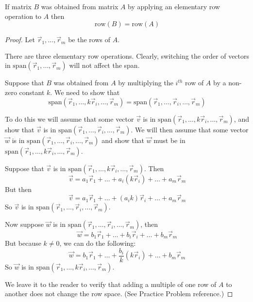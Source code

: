 \documentclass{ximera}
\begin{document}
\begin{theorem}\label{th:rowBrowA} If matrix $B$ was obtained from matrix $A$ by applying an elementary row operation to $A$ then
$$\mbox{row}(B)=\mbox{row}(A)$$
\end{theorem}
\begin{proof}
Let $\vec{r}_1,\ldots ,\vec{r}_m$ be the rows of $A$. 

There are three elementary row operations.  Clearly, switching the order of vectors in $\mbox{span}(\vec{r}_1,\ldots  ,\vec{r}_m)$ will not affect the span.  

Suppose that $B$ was obtained from $A$ by multiplying the $i^{th}$ row of $A$ by a non-zero constant $k$.  We need to show that 
$$\mbox{span}(\vec{r}_1,\ldots ,k\vec{r}_i,\ldots ,\vec{r}_m)=\mbox{span}(\vec{r}_1,\ldots ,\vec{r}_i,\ldots ,\vec{r}_m)$$

To do this we will assume that some vector $\vec{v}$ is in $\mbox{span}(\vec{r}_1,\ldots ,k\vec{r}_i,\ldots ,\vec{r}_m)$, and show that $\vec{v}$ is in $\mbox{span}(\vec{r}_1,\ldots ,\vec{r}_i,\ldots ,\vec{r}_m)$.  We will then assume that some vector $\vec{w}$ is in $\mbox{span}(\vec{r}_1,\ldots ,\vec{r}_i,\ldots ,\vec{r}_m)$ and show that $\vec{w}$ must be in $\mbox{span}(\vec{r}_1,\ldots ,k\vec{r}_i,\ldots ,\vec{r}_m)$.

Suppose that $\vec{v}$ is in $\mbox{span}(\vec{r}_1,\ldots ,k\vec{r}_i,\ldots ,\vec{r}_m)$.  Then 
$$\vec{v}=a_1\vec{r}_1+\ldots +a_i(k\vec{r}_i)+\ldots +a_m\vec{r}_m$$
But then 
$$\vec{v}=a_1\vec{r}_1+\ldots +(a_ik)\vec{r}_i+\ldots +a_m\vec{r}_m$$
So $\vec{v}$ is in $\mbox{span}(\vec{r}_1,\ldots ,\vec{r}_i,\ldots ,\vec{r}_m)$.

Now suppose $\vec{w}$ is in $\mbox{span}(\vec{r}_1,\ldots ,\vec{r}_i,\ldots ,\vec{r}_m)$, then
$$\vec{w}=b_1\vec{r}_1+\ldots +b_i\vec{r}_i+\ldots +b_m\vec{r}_m$$
But because $k\neq 0$, we can do the following:
$$\vec{w}=b_1\vec{r}_1+\ldots +\frac{b_i}{k}(k\vec{r}_i)+\ldots +b_m\vec{r}_m$$
So $\vec{w}$ is in $\mbox{span}(\vec{r}_1,\ldots ,k\vec{r}_i,\ldots ,\vec{r}_m)$.
  
We leave it to the reader to verify that adding a multiple of one row of $A$ to another does not change the row space.  (See Practice Problem {\color{red}reference}.)  
  

\end{proof}
\end{document}

